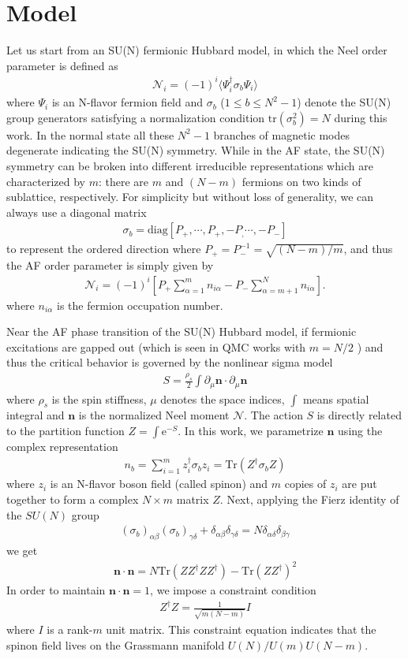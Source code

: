 \documentclass[aps,twocolumn,superscriptaddress]{revtex4-1}
\newcommand{\bea}{\begin{eqnarray}}
\newcommand{\eea}{\end{eqnarray}}
\newcommand{\bn}{\mathbf{n}}
\newcommand{\me}{\mathrm{e}}
\begin{document}
\section{Model}
Let us start from an SU(N) fermionic Hubbard model, in which the Neel order parameter is defined as \bea \mathcal{N}_i=(-1)^i\langle \Psi_i^\dagger \sigma_b \Psi_i\rangle \eea where $\Psi_i$ is an N-flavor fermion field and $\sigma_b$ ($1\le b\le N^2-1$) denote the SU(N) group generators satisfying a normalization condition $\mathrm{tr}(\sigma_b^2)=N$ during this work. In the normal state all these $N^2-1$ branches of magnetic modes degenerate indicating the SU(N) symmetry. While in the AF state, the SU(N) symmetry can be broken into different irreducible representations which are characterized by $m$: there are $m$ and $(N-m)$ fermions on two kinds of sublattice, respectively. For simplicity but without loss of generality, we can always use a diagonal matrix \bea \sigma_b=\text{diag}\left[P_+,\cdots,P_+,-P_,\cdots,-P_-\right] \eea to represent the ordered direction where $P_+=P_-^{-1}=\sqrt{(N-m)/m}$, and thus the AF order parameter is simply given by \bea \mathcal{N}_i=(-1)^i\left[P_+\sum_{\alpha=1}^m n_{i\alpha}-P_-\sum_{\alpha=m+1}^{N}n_{i\alpha} \right]. \eea where $n_{i\alpha}$ is the fermion occupation number. 

Near the AF phase transition of the SU(N) Hubbard model, if fermionic excitations are gapped out (which is seen in QMC works with $m=N/2$ \cite{cai2013,wang2014}) and thus the critical behavior is governed by the nonlinear sigma model
\bea \label{eq:NLsM}S=\frac{\rho_s}{2}\int \partial_\mu\bn \cdot \partial_\mu\bn \eea
where $\rho_s$ is the spin stiffness, $\mu$ denotes the space indices, $\int$ means spatial integral and $\bn$ is the normalized Neel moment $\mathcal{N}$. The action $S$ is directly related to the partition function $Z=\int \me^{-S}$. In this work, we parametrize $\bn$ using the complex representation \bea \label{eq:cprep}n_b=\sum_{i=1}^m z_i^\dag \sigma_b z_i=\mathrm{Tr}(Z^\dag\sigma_b Z) \eea where $z_i$ is an N-flavor boson field (called spinon) and $m$ copies of $z_i$ are put together to form a complex $N\times m$ matrix $Z$. Next, applying the Fierz identity of the $SU(N)$ group
\bea \label{eq:Fierz} (\sigma_b)_{\alpha\beta} (\sigma_b)_{\gamma\delta}+\delta_{\alpha\beta}\delta_{\gamma\delta}=N\delta_{\alpha\delta}\delta_{\beta\gamma} \eea
we get
\bea \bn\cdot\bn = N\mathrm{Tr}(ZZ^\dag Z Z^\dag)-\mathrm{Tr}(ZZ^\dag)^2 \eea
In order to maintain $\bn\cdot\bn=1$, we impose a constraint condition \bea Z^\dag Z=\frac{1}{\sqrt{m(N-m)}}I \label{eq:normalizeZ}\eea
where $I$ is a rank-$m$ unit matrix. This constraint equation indicates that the spinon field lives on the Grassmann manifold $U(N)/U(m)U(N-m)$. 
\end{document}
